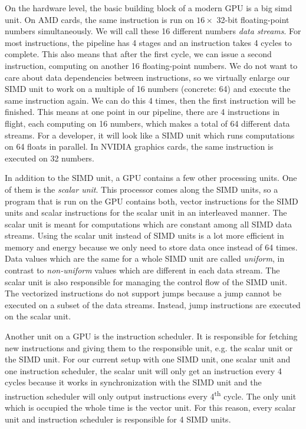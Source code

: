 On the hardware level, the basic building block of a modern GPU is a big \gls{simd} unit. On AMD cards, the same instruction is run on $16 \times$ 32-bit floating-point numbers simultaneously. We will call these 16 different numbers \emph{data streams}. For most instructions, the pipeline has 4 stages and an instruction takes 4 cycles to complete. This also means that after the first cycle, we can issue a second instruction, computing on another 16 floating-point numbers. We do not want to care about data dependencies between instructions, so we virtually enlarge our SIMD unit to work on a multiple of 16 numbers (concrete: 64) and execute the same instruction again. We can do this 4 times, then the first instruction will be finished. This means at one point in our pipeline, there are 4 instructions in flight, each computing on 16 numbers, which makes a total of 64 different data streams. For a developer, it will look like a SIMD unit which runs computations on 64 floats in parallel. In NVIDIA graphics cards, the same instruction is executed on 32 numbers.

In addition to the SIMD unit, a GPU contains a few other processing units. One of them is the \emph{scalar unit}. This processor comes along the SIMD units, so a program that is run on the GPU contains both, vector instructions for the SIMD units and scalar instructions for the scalar unit in an interleaved manner. The scalar unit is meant for computations which are constant among all SIMD data streams. Using the scalar unit instead of SIMD units is a lot more efficient in memory and energy because we only need to store data once instead of 64 times. Data values which are the same for a whole SIMD unit are called \emph{uniform}, in contrast to \emph{non-uniform} values which are different in each data stream. The scalar unit is also responsible for managing the control flow of the SIMD unit. The vectorized instructions do not support jumps because a jump cannot be executed on a subset of the data streams. Instead, jump instructions are executed on the scalar unit.

Another unit on a GPU is the instruction scheduler. It is responsible for fetching new instructions and giving them to the responsible unit, e.g. the scalar unit or the SIMD unit. For our current setup with one SIMD unit, one scalar unit and one instruction scheduler, the scalar unit will only get an instruction every 4 cycles because it works in synchronization with the SIMD unit and the instruction scheduler will only output instructions every 4\textsuperscript{th} cycle. The only unit which is occupied the whole time is the vector unit. For this reason, every scalar unit and instruction scheduler is responsible for 4 SIMD units.

